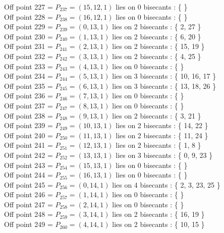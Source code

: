 \documentclass{article}
\begin{document}
{Off point 227 = $P_{237} = ( 15, 12, 1 )$ lies on 0 bisecants : \{  \}\\
Off point 228 = $P_{238} = ( 16, 12, 1 )$ lies on 0 bisecants : \{  \}\\
Off point 229 = $P_{239} = ( 0, 13, 1 )$ lies on 2 bisecants : \{ 2, 27 \}\\
Off point 230 = $P_{240} = ( 1, 13, 1 )$ lies on 2 bisecants : \{ 6, 20 \}\\
Off point 231 = $P_{241} = ( 2, 13, 1 )$ lies on 2 bisecants : \{ 15, 19 \}\\
Off point 232 = $P_{242} = ( 3, 13, 1 )$ lies on 2 bisecants : \{ 4, 25 \}\\
Off point 233 = $P_{243} = ( 4, 13, 1 )$ lies on 0 bisecants : \{  \}\\
Off point 234 = $P_{244} = ( 5, 13, 1 )$ lies on 3 bisecants : \{ 10, 16, 17 \}\\
Off point 235 = $P_{245} = ( 6, 13, 1 )$ lies on 3 bisecants : \{ 13, 18, 26 \}\\
Off point 236 = $P_{246} = ( 7, 13, 1 )$ lies on 0 bisecants : \{  \}\\
Off point 237 = $P_{247} = ( 8, 13, 1 )$ lies on 0 bisecants : \{  \}\\
Off point 238 = $P_{248} = ( 9, 13, 1 )$ lies on 2 bisecants : \{ 3, 21 \}\\
Off point 239 = $P_{249} = ( 10, 13, 1 )$ lies on 2 bisecants : \{ 14, 22 \}\\
Off point 240 = $P_{250} = ( 11, 13, 1 )$ lies on 2 bisecants : \{ 11, 24 \}\\
Off point 241 = $P_{251} = ( 12, 13, 1 )$ lies on 2 bisecants : \{ 1, 8 \}\\
Off point 242 = $P_{252} = ( 13, 13, 1 )$ lies on 3 bisecants : \{ 0, 9, 23 \}\\
Off point 243 = $P_{254} = ( 15, 13, 1 )$ lies on 0 bisecants : \{  \}\\
Off point 244 = $P_{255} = ( 16, 13, 1 )$ lies on 0 bisecants : \{  \}\\
Off point 245 = $P_{256} = ( 0, 14, 1 )$ lies on 4 bisecants : \{ 2, 3, 23, 25 \}\\
Off point 246 = $P_{257} = ( 1, 14, 1 )$ lies on 0 bisecants : \{  \}\\
Off point 247 = $P_{258} = ( 2, 14, 1 )$ lies on 0 bisecants : \{  \}\\
Off point 248 = $P_{259} = ( 3, 14, 1 )$ lies on 2 bisecants : \{ 16, 19 \}\\
Off point 249 = $P_{260} = ( 4, 14, 1 )$ lies on 2 bisecants : \{ 10, 15 \}\\
}
\end{document}
